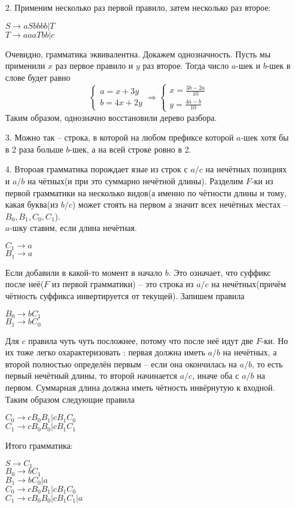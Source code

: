 \documentclass[12pt]{article}
\begin{document}
\bigskip

\begin{enumerate}
\item[2.] Применим несколько раз первой правило, затем несколько раз второе:
\begin{myquote}
$S \to aSbbbb |  T$\\
$T \to aaaTbb | c$
\end{myquote}
Очевидно, грамматика эквивалентна. Докажем однозначность. Пусть мы применили $x$ раз первое правило и $y$ раз второе. Тогда число $a$-шек и $b$-шек в слове будет равно\\
\begin{equation*}
 \begin{cases}
  a = x + 3y\\
  b = 4x + 2y
 \end{cases}
\Rightarrow
 \begin{cases}
   x = \frac{3b-2a}{10}\\
   y = \frac{4a-b}{10}
 \end{cases}
\end{equation*}
Таким образом, однозначно восстановили дерево разбора.
\item[3.] Можно так -- строка, в которой на любом префиксе которой $a$-шек хотя бы в 2 раза больше $b$-шек, а на всей строке ровно в 2.
\item[4.] Второая грамматика порождает язые из строк с $a/c$ на нечётных позициях и $a/b$ на чётных(и при это суммарно нечётной длины). Разделим $F$-ки из первой грамматики на несколько видов(а именно по чётности длины и тому, какая буква(из $b/c$) может стоять на первом а значит всех нечётных местах -- $B_0, B_1 , C_0, C_1$). \\
$a$-шку ставим, если длина нечётная.
 \begin{myquote}
$C_1 \to a$\\
$B_1 \to a$
\end{myquote}
Если добавили в какой-то момент в начало $b$. Это означает, что суффикс после неё($F$ из первой грамматики) -- это строка из $a/c$ на нечётных(причём чётность суффикса инвертируется от текущей). Запишем правила
 \begin{myquote}
$B_0 \to bC_1$\\
$B_1 \to bC_0$
\end{myquote}
Для $c$ правила чуть чуть посложнее, потому что после неё идут две $F$-ки. Но их тоже легко охарактеризовать : первая должна иметь $a/b$ на нечётных, а второй полностью определён первым -- если она окончилась на $a/b$, то есть первый нечётный длины, то второй начинается $a/c$, иначе оба с $a/b$ на первом. Суммарная длина должна иметь чётность инвёрнутую к входной. Таким образом следующие правила
 \begin{myquote}
$C_0 \to cB_0B_1|cB_1C_0$\\
$C_1 \to cB_0B_0 |cB_1C_1$
\end{myquote}


Итого грамматика:

\begin{myquote}
$S \to C_1$\\
$B_0 \to bC_1$\\
$B_1 \to bC_0 | a$\\
$C_0 \to cB_0B_1|cB_1C_0$\\
$C_1 \to cB_0B_0 |cB_1C_1 | a$
\end{myquote}
\end{enumerate}
\end{document}
